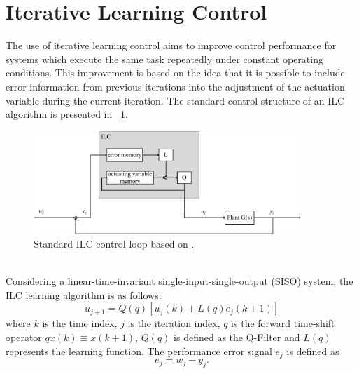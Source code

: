 \section{Iterative Learning Control}\label{ILC}
The use of iterative learning control aims to improve control performance for systems which execute the same task repeatedly under constant operating conditions. This improvement is based on the idea that it is possible to include error information from previous iterations into the adjustment of the actuation variable during the current iteration.
The standard control structure of an ILC algorithm is presented in \figurename~\ref{fig:ILC_only}.
\begin{figure}[ht]
   \centering
   \includegraphics[width=0.9\textwidth]{images/chapt_3/ILC_only.pdf}
   \caption[Standard ILC control loop]{Standard ILC control loop based on \cite{ILC2}.}
   \label{fig:ILC_only}
 \end{figure}
\\Considering a linear-time-invariant single-input-single-output (SISO) system, the ILC learning algorithm is as follows:
\begin{equation}
    u_{j+1}  = Q(q)[u_{j}(k)+L(q)e_{j}(k+1)]
 \label{eq:ILC_standard}
\end{equation}
where $k$ is the time index, $j$ is the iteration index, $q$ is the forward time-shift operator $qx(k) \equiv x(k + 1)$, $Q(q)$ is defined as the Q-Filter and $L(q)$ represents the learning function. The performance error signal $e_{j}$ is defined as
\begin{equation}
    e_{j}  = w_{j}-y_{j}.
 \label{eq:perf_error}
\end{equation}

